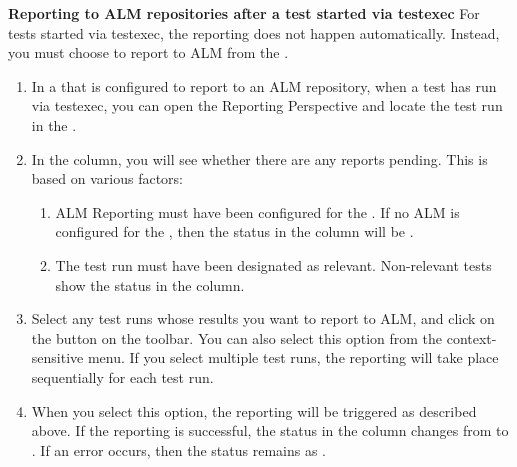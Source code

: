 \textbf{Reporting to ALM repositories after a test started via testexec}
\label{TasksALMReportTestExec}
For tests started via testexec, the reporting does not happen automatically. Instead, you must choose to report to ALM from the \gdtestsummaryview{}.

\begin{enumerate}
\item In a \gdproject{} that is configured to report to an ALM repository, when a test has run via testexec, you can open the Reporting Perspective and locate the test run in the \gdtestsummaryview{}.
\item In the  column, you will see whether there are any reports pending. This is based on various factors:
\begin{enumerate}
\item ALM Reporting must have been configured for the \gdproject{}. If no ALM is configured for the \gdproject{}, then the status in the  column will be .
\item The test run must have been designated as relevant. Non-relevant tests show the status  in the  column.
\end{enumerate}
\item Select any test runs whose results you want to report to ALM, and click on the  button on the toolbar. You can also select this option from the context-sensitive menu. If you select multiple test runs, the reporting will take place sequentially for each test run. 
\item When you select this option, the reporting will be triggered as described above. If the reporting is successful, the status in the  column changes from  to . If an error occurs, then the status remains as . 
\end{enumerate}


